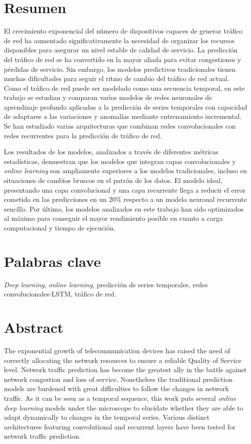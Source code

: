 \section*{Resumen}
El crecimiento exponencial del número de dispositivos capaces de generar tráfico de red ha aumentado significativamente la necesidad de organizar los recursos disponibles para asegurar un nivel estable de calidad de servicio. La predicción del tráfico de red se ha convertido en la mayor aliada para evitar congestiones y pérdidas de servicio. Sin embargo, los modelos predictivos tradicionales tienen muchas dificultades para seguir el ritmo de cambio del tráfico de red actual. Como el tráfico de red puede ser modelado como una secuencia temporal, en este trabajo se estudian y comparan varios modelos de redes neuronales de aprendizaje profundo aplicadas a la predicción de series temporales con capacidad de adaptarse a las variaciones y anomalías mediante entrenamiento incremental. Se han estudiado varias arquitecturas que combinan redes convolucionales con redes recurrentes para la predicción de tráfico de red.

Los resultados de los modelos, analizados a través de diferentes métricas estadísticas, demuestran que los modelos que integran capas convolucionales y \textit{online learning} son ampliamente superiores a los modelos tradicionales, incluso en situaciones de cambios bruscos en el patrón de los datos. El modelo ideal, presentando una capa convolucional y una capa recurrente llega a reducir el error cometido en las predicciones en un 20\% respecto a un modelo neuronal recurrente sencillo. Por último, los modelos analizados en este trabajo han sido optimizados al máximo para conseguir el mayor rendimiento posible en cuanto a carga computacional y tiempo de ejecución.

\section*{Palabras clave}
\textit{Deep learning}, \textit{online learning}, predicción de series temporales, redes convolucionales-LSTM, tráfico de red.

\section*{Abstract}
The exponential growth of telecommunication devices has raised the need of correctly allocating the network resources to ensure a reliable Quality of Service level. Network traffic prediction has become the greatest ally in the battle against network congestion and loss of service. Nonetheless the traditional prediction models are burdened with great difficulties to follow the changes in network traffic. As it can be seen as a temporal sequence, this work puts several \textit{online deep learning} models under the microscope to elucidate whether they are able to adapt dynamically to changes in the temporal series. Various distinct architectures featuring convolutional and recurrent layers have been tested for network traffic prediction.

